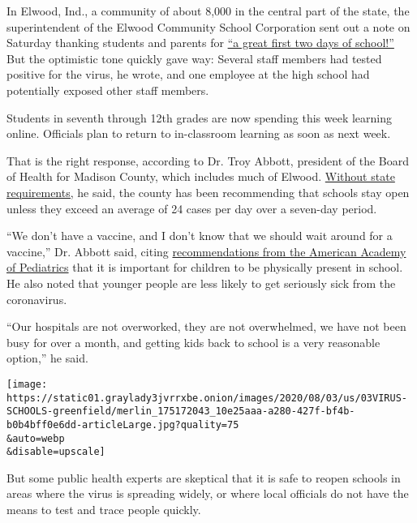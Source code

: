In Elwood, Ind., a community of about 8,000 in the central part of the
state, the superintendent of the Elwood Community School Corporation
sent out a note on Saturday thanking students and parents for
\href{https://www.facebookcorewwwi.onion/ElwoodCommunitySchools/photos/pcb.1875944365880857/1875944205880873/?type=3\&theater}{``a
great first two days of school!''} But the optimistic tone quickly gave
way: Several staff members had tested positive for the virus, he wrote,
and one employee at the high school had potentially exposed other staff
members.

Students in seventh through 12th grades are now spending this week
learning online. Officials plan to return to in-classroom learning as
soon as next week.

That is the right response, according to Dr. Troy Abbott, president of
the Board of Health for Madison County, which includes much of Elwood.
\href{https://www.indystar.com/story/news/education/2020/08/02/indiana-schools-reopening-how-we-know-districts-safe/5558849002/}{Without
state requirements,} he said, the county has been recommending that
schools stay open unless they exceed an average of 24 cases per day over
a seven-day period.

``We don't have a vaccine, and I don't know that we should wait around
for a vaccine,'' Dr. Abbott said, citing
\href{https://www.nytimes3xbfgragh.onion/2020/06/30/us/coronavirus-schools-reopening-guidelines-aap.html}{recommendations
from the American Academy of Pediatrics} that it is important for
children to be physically present in school. He also noted that younger
people are less likely to get seriously sick from the coronavirus.

``Our hospitals are not overworked, they are not overwhelmed, we have
not been busy for over a month, and getting kids back to school is a
very reasonable option,'' he said.

\texttt{[image: https://static01.graylady3jvrrxbe.onion/images/2020/08/03/us/03VIRUS-SCHOOLS-greenfield/merlin\_175172043\_10e25aaa-a280-427f-bf4b-b0b4bff0e6dd-articleLarge.jpg?quality=75\\\&auto=webp\\\&disable=upscale]}

But some public health experts are skeptical that it is safe to reopen
schools in areas where the virus is spreading widely, or where local
officials do not have the means to test and trace people quickly.

\href{https://www.nytimes3xbfgragh.onion/news-event/coronavirus?action=click\&pgtype=Article\&state=default\&region=MAIN_CONTENT_3\&context=storylines_faq}{}

